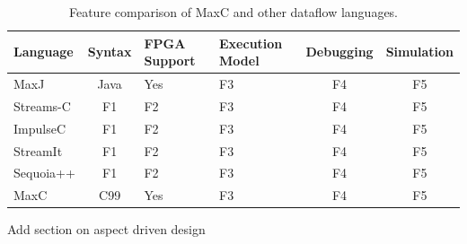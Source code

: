 \begin{table}[!h]
  \renewcommand{\arraystretch}{1.3}
  \centering
  \caption{Feature comparison of MaxC and other dataflow languages.}
  \label{table:feature-comparison}
  \begin{tabular}{ l | c |  p{1cm} |  p{1cm} |  c |  c }
    Language  & Syntax & FPGA Support & Execution Model & Debugging & Simulation \\ \hline
    MaxJ      & Java   & Yes          & F3              & F4        & F5         \\
    Streams-C & F1     & F2           & F3              & F4        & F5         \\
    ImpulseC  & F1     & F2           & F3              & F4        & F5         \\
    StreamIt  & F1     & F2           & F3              & F4        & F5         \\
    Sequoia++ & F1     & F2           & F3              & F4        & F5         \\
    MaxC      & C99    & Yes          & F3              & F4        & F5         \\
  \end{tabular}
\end{table}
\TODO Add section on aspect driven design
